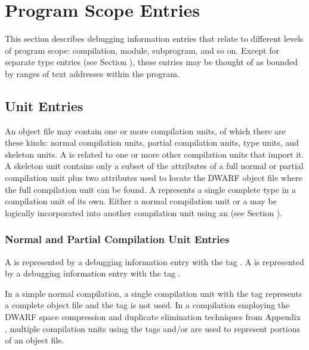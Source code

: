 \chapter{Program Scope Entries}
\label{chap:programscopeentries} 
This section describes debugging information entries that
relate to different levels of program scope: compilation,
module, subprogram, and so on. Except for separate type
entries (see Section ), 
these entries may be thought of
as bounded by ranges of text addresses within the program.

\section{Unit Entries}
\label{chap:unitentries}
An object file may contain one or more compilation units,
of which there are
these kinds:
normal compilation units,
partial compilation units, 
type units, and
skeleton units. A 
is related to one or more other compilation units that
import it.  
A skeleton unit contains only a subset of the attributes of 
a full normal or partial compilation unit plus two attributes 
used to locate the DWARF object file where the full 
compilation unit can be found.
A  represents a single complete type 
in a compilation unit of its own.
Either a normal compilation unit or a 
may be logically incorporated into another
compilation unit using an 
(see Section ).


\subsection[Normal and Partial CU Entries]{Normal and Partial Compilation Unit Entries}
\label{chap:normalandpartialcompilationunitentries}
 
A  
is represented by a debugging information entry with the tag 
\DWTAGcompileunitTARG. 
A  
is represented by a debugging information entry with the tag 
\DWTAGpartialunitTARG.

In a simple normal compilation, a single compilation unit with
the tag 
\DWTAGcompileunit{} represents a complete object file
and the tag 
\DWTAGpartialunit{} is not used. 
In a compilation
employing the DWARF space compression and duplicate elimination
techniques from 
Appendix , 
multiple compilation units using
the tags 
\DWTAGcompileunit{} and/or 
\DWTAGpartialunit{} are
used to represent portions of an object file.

